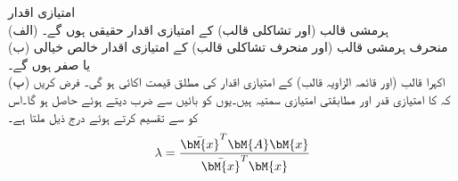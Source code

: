 \quad امتیازی اقدار\\
(الف) ہرمشی قالب (اور تشاکلی قالب) کے امتیازی اقدار حقیقی ہوں گے۔\\
(ب) منحرف ہرمشی قالب (اور منحرف تشاکلی قالب) کے امتیازی اقدار خالص خیالی یا صفر  ہوں گے۔\\
(پ) اکہرا قالب (اور قائمہ الزاویہ قالب) کے امتیازی اقدار کی مطلق قیمت اکائی  ہو گی۔
فرض کریں کہ  کا امتیازی قدر   اور مطابقتی امتیازی سمتیہ   ہیں۔یوں  کو بائیں   سے ضرب دیتے ہوئے  حاصل ہو گا۔اس کو   سے تقسیم کرتے ہوئے درج ذیل ملتا ہے۔
\begin{align}\label{مساوات_امتیازی_مسئلہ_اقدار_الف}
\lambda=\frac{\bar{\bM{x}}^T\bM{A}\bM{x}}{\bar{\bM{x}}^T\bM{x}}
\end{align}

